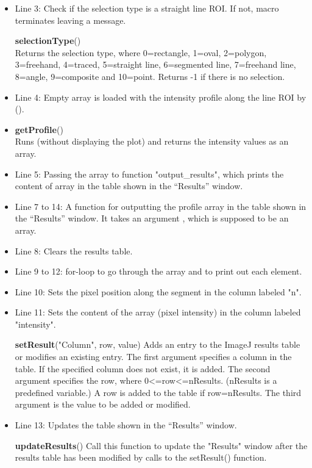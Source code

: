 \begin{itemize}
\item Line 3: Check if the selection type is a straight line ROI. If not, macro terminates leaving a message. 

\begin{indentCom}
\textbf{selectionType}()\\ 
Returns the selection type, where 0=rectangle, 1=oval, 2=polygon, 3=freehand, 4=traced, 5=straight line, 6=segmented line, 7=freehand line, 8=angle, 9=composite and 10=point. Returns -1 if there is no selection.
\end{indentCom}

\item Line 4: Empty array  is loaded with the intensity profile along the line ROI by ().
\item
\begin{indentCom}
\textbf{getProfile}()\\
Runs  (without displaying the plot) and returns the intensity values as an array.
\end{indentCom}

\item Line 5: Passing the array  to function "output\_results", which prints the content of array in the table shown in the ``Results'' window. 

\item Line 7 to 14: A function for outputting the profile array in the table shown in the ``Results'' window. It takes an argument , which is supposed to be an array. 
\item Line 8: Clears the results table. 
\item Line 9 to 12: for-loop to go through the array and to print out each element. 
\item Line 10: Sets the pixel position along the segment in the column labeled "n". 
\item Line 11: Sets the content of the array (pixel intensity) in the column labeled "intensity".

\begin{indentCom}
\textbf{setResult}("Column", row, value)
Adds an entry to the ImageJ results table or modifies an existing entry. The first argument specifies a column in the table. If the specified column does not exist, it is added. The second argument specifies the row, where 0<=row<=nResults. (nResults is a predefined variable.) A row is added to the table if row=nResults. The third argument is the value to be added or modified. 
\end{indentCom}
\item Line 13: Updates the table shown in the ``Results'' window. 

\begin{indentCom}
\textbf{updateResults}()
Call this function to update the "Results" window after the results table has been modified by calls to the setResult() function. 
\end{indentCom}
\end{itemize}

